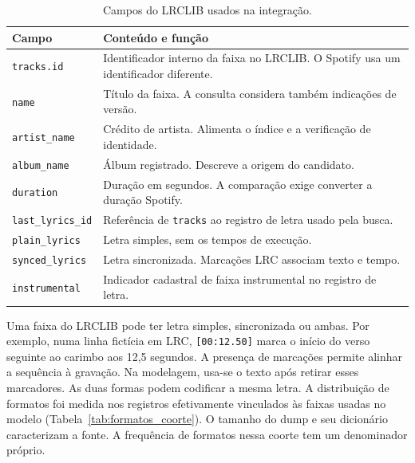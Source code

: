 \begin{table}[H]\centering\small
\caption{Campos do LRCLIB usados na integração.}\label{tab:diclrclib}
\begin{tabular}{@{}P{.29\linewidth}P{.65\linewidth}@{}}\toprule
Campo & Conteúdo e função \\\midrule
\texttt{tracks.id} & Identificador interno da faixa no LRCLIB. O Spotify usa um identificador diferente. \\
\texttt{name} & Título da faixa. A consulta considera também indicações de versão. \\
\texttt{artist\_name} & Crédito de artista. Alimenta o índice e a verificação de identidade. \\
\texttt{album\_name} & Álbum registrado. Descreve a origem do candidato. \\
\texttt{duration} & Duração em segundos. A comparação exige converter a duração Spotify. \\
\texttt{last\_lyrics\_id} & Referência de \texttt{tracks} ao registro de letra usado pela busca. \\
\texttt{plain\_lyrics} & Letra simples, sem os tempos de execução. \\
\texttt{synced\_lyrics} & Letra sincronizada. Marcações LRC associam texto e tempo. \\
\texttt{instrumental} & Indicador cadastral de faixa instrumental no registro de letra. \\\bottomrule
\end{tabular}
\end{table}

Uma faixa do LRCLIB pode ter letra simples, sincronizada ou ambas. Por exemplo, numa linha fictícia em LRC, \texttt{[00:12.50]} marca o início do verso seguinte ao carimbo aos 12,5 segundos. A presença de marcações permite alinhar a sequência à gravação. Na modelagem, usa-se o texto após retirar esses marcadores. As duas formas podem codificar a mesma letra. A distribuição de formatos foi medida nos registros efetivamente vinculados às faixas usadas no modelo (Tabela~\ref{tab:formatos_coorte}). O tamanho do dump e seu dicionário caracterizam a fonte. A frequência de formatos nessa coorte tem um denominador próprio.

